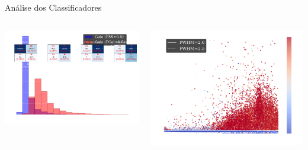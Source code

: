 \begin{frame}[c]{Análise dos Classificadores}
    \begin{columns}[c]
        \begin{column}{0.42\textwidth} %
            \centering
            \includegraphics[width=\linewidth, height=0.5\textheight, keepaspectratio]{images/distribution_of_stars_and_galaxies_with_cm.png}
        \end{column}
        \begin{column}{0.4\textwidth} %
            \includegraphics[width=\linewidth, height=0.5\textheight, keepaspectratio]{images/predic_colored.png}
        \end{column}

\end{columns}
\end{frame}
